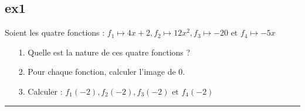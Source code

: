 \documentclass[10pt]{article}
\newcommand{\horrule}[1]{\rule{\linewidth}{#1}} %
\begin{document}
\begin{multicols}{2}
  \subsection*{ex1}

  Soient les quatre fonctions : 
  $f_1 \mapsto 4x + 2, 
  f_2 \mapsto 12x^2, 
  f_3 \mapsto -20 \text{ et } 
  f_4 \mapsto -5x$

  \begin{itemize}
  \item[1.] Quelle est la nature de ces quatre fonctions ?
  \item[2.] Pour chaque fonction, calculer l'image de 0.
  \item[3.] Calculer : $f_1(-2), f_2(-2), f_3(-2)  \text{ et } f_4(-2)$
  \end{itemize}
\end{multicols}
\horrule{0.5px}
\end{document}
